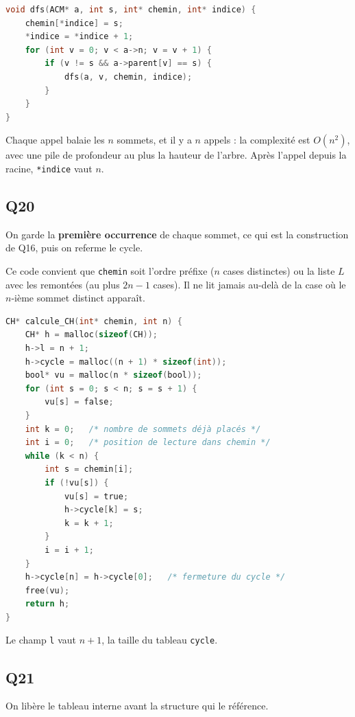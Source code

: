 \documentclass[11pt,a4paper]{article}
\begin{document}
\begin{lstlisting}[language=C]
void dfs(ACM* a, int s, int* chemin, int* indice) {
    chemin[*indice] = s;
    *indice = *indice + 1;
    for (int v = 0; v < a->n; v = v + 1) {
        if (v != s && a->parent[v] == s) {
            dfs(a, v, chemin, indice);
        }
    }
}
\end{lstlisting}

Chaque appel balaie les \(n\) sommets, et il y a \(n\) appels : la complexité est \(O(n^2)\), avec une pile de profondeur au plus la hauteur de l'arbre. Après l'appel depuis la racine, \texttt{*indice} vaut \(n\).

\hypertarget{q20}{%
\subsection{Q20}\label{q20}}

On garde la \textbf{première occurrence} de chaque sommet, ce qui est la construction de Q16, puis on referme le cycle.

Ce code convient que \texttt{chemin} soit l'ordre préfixe (\(n\) cases distinctes) ou la liste \(L\) avec les remontées (au plus \(2n-1\) cases). Il ne lit jamais au-delà de la case où le \(n\)-ième sommet distinct apparaît.

\begin{lstlisting}[language=C]
CH* calcule_CH(int* chemin, int n) {
    CH* h = malloc(sizeof(CH));
    h->l = n + 1;
    h->cycle = malloc((n + 1) * sizeof(int));
    bool* vu = malloc(n * sizeof(bool));
    for (int s = 0; s < n; s = s + 1) {
        vu[s] = false;
    }
    int k = 0;   /* nombre de sommets déjà placés */
    int i = 0;   /* position de lecture dans chemin */
    while (k < n) {
        int s = chemin[i];
        if (!vu[s]) {
            vu[s] = true;
            h->cycle[k] = s;
            k = k + 1;
        }
        i = i + 1;
    }
    h->cycle[n] = h->cycle[0];   /* fermeture du cycle */
    free(vu);
    return h;
}
\end{lstlisting}

Le champ \texttt{l} vaut \(n+1\), la taille du tableau \texttt{cycle}.

\hypertarget{q21}{%
\subsection{Q21}\label{q21}}

On libère le tableau interne avant la structure qui le référence.
\end{document}
